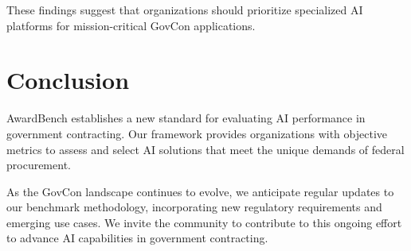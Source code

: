 \documentclass[11pt,a4paper]{article}
\begin{document}
These findings suggest that organizations should prioritize specialized AI platforms for mission-critical GovCon applications.

\section{Conclusion}
AwardBench establishes a new standard for evaluating AI performance in government contracting. Our framework provides organizations with objective metrics to assess and select AI solutions that meet the unique demands of federal procurement.

As the GovCon landscape continues to evolve, we anticipate regular updates to our benchmark methodology, incorporating new regulatory requirements and emerging use cases. We invite the community to contribute to this ongoing effort to advance AI capabilities in government contracting.
\end{document}
